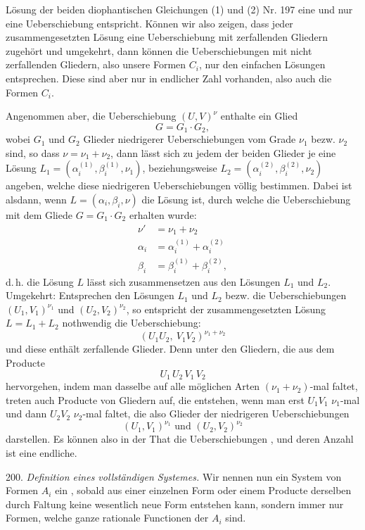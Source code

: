 L\"osung der beiden diophantischen Gleichungen (1) und (2) Nr. 197 eine und nur eine Ueberschiebung entspricht. K\"onnen wir also zeigen, dass jeder zusammengesetzten L\"osung eine Ueberschiebung mit zerfallenden Gliedern zugeh\"ort und umgekehrt, dann k\"onnen die Ueberschiebungen mit nicht zerfallenden Gliedern, also unsere Formen $C_i$, nur den einfachen L\"osungen entsprechen. Diese sind aber nur in endlicher Zahl vorhanden, also auch die Formen $C_i$.

Angenommen aber, die Ueberschiebung $(U, V)^{\nu}$ enthalte ein Glied
\[
G = G_1 \cdot G_2,
\]
wobei $G_1$ und $G_2$ Glieder niedrigerer Ueberschiebungen vom Grade $\nu_1$ bezw. $\nu_2$ sind, so dass $\nu = \nu_1 + \nu_2$, dann l\"asst sich zu jedem der beiden Glieder je eine L\"osung $L_1 = (\alpha_i^{(1)}, \beta_i^{(1)}, \nu_1)$, beziehungsweise $L_2 = (\alpha_i^{(2)}, \beta_i^{(2)}, \nu_2)$ angeben, welche diese niedrigeren Ueberschiebungen v\"ollig bestimmen. Dabei ist alsdann, wenn $L = (\alpha_i, \beta_i, \nu)$ die L\"osung ist, durch welche die Ueberschiebung mit dem Gliede $G = G_1 \cdot G_2$ erhalten wurde:
\[
\begin{aligned}
\nu' &= \nu_1 + \nu_2 \\
\alpha_i &= \alpha_i^{(1)} + \alpha_i^{(2)} \\
\beta_i &= \beta_i^{(1)} + \beta_i^{(2)},
\end{aligned}
\]
d.\,h. die L\"osung $L$ l\"asst sich zusammensetzen aus den L\"osungen $L_1$ und $L_2$. Umgekehrt: Entsprechen den L\"osungen $L_1$ und $L_2$ bezw. die Ueberschiebungen $(U_1, V_1)^{\nu_1}$ und $(U_2, V_2)^{\nu_2}$, so entspricht der zusammengesetzten L\"osung $L = L_1 + L_2$ nothwendig die Ueberschiebung:
\[
(U_1 U_2, \ V_1 V_2)^{\nu_1+\nu_2}
\]
und diese enth\"alt zerfallende Glieder. Denn unter den Gliedern, die aus dem Producte
\[
U_1\, U_2\, V_1\, V_2
\]
hervorgehen, indem man dasselbe auf alle m\"oglichen Arten $(\nu_1+\nu_2)$-mal faltet, treten auch Producte von Gliedern auf, die entstehen, wenn man erst $U_1 V_1$ $\nu_1$-mal und dann $U_2 V_2$ $\nu_2$-mal faltet, die also Glieder der niedrigeren Ueberschiebungen
\[
(U_1, V_1)^{\nu_1} \text{ und } (U_2, V_2)^{\nu_2}
\]
darstellen. Es k\"onnen also in der That die Ueberschiebungen , und deren Anzahl ist eine endliche.

200. \textit{Definition eines vollst\"andigen Systemes.} Wir nennen nun ein System von Formen $A_i$ ein , sobald aus einer einzelnen Form oder einem Producte derselben durch Faltung keine wesentlich neue Form entstehen kann, sondern immer nur Formen, welche ganze rationale Functionen der $A_i$ sind.


